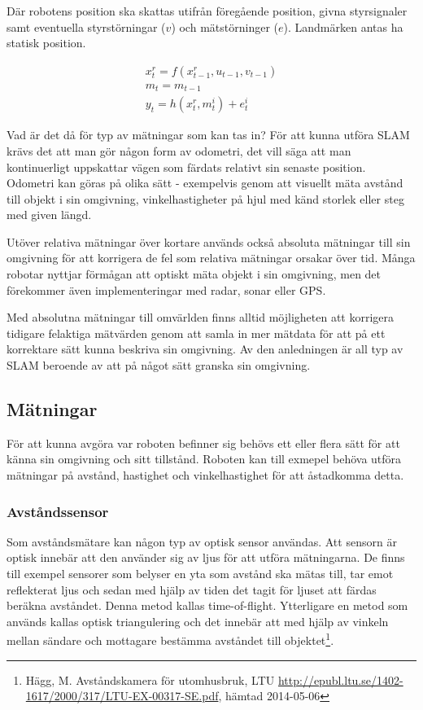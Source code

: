 \documentclass[a4paper,12pt,fleqn]{article}
\begin{document}
Där robotens position ska skattas utifrån föregående position, givna styrsignaler samt eventuella styrstörningar ($v$) och mätstörninger ($e$). Landmärken antas ha statisk position. 

\begin{gather}
x_{t}^r = f(x_{t-1}^r, u_{t-1}, v_{t-1}) \\
m_{t} = m_{t-1} \\
y_{t} = h(x_{t}^r,m_{t}^i) + e_{t}^i
\end{gather}

%
Vad är det då för typ av mätningar som kan tas in? För att kunna utföra SLAM krävs det att man gör någon form av odometri, det vill säga att man kontinuerligt uppskattar vägen som färdats relativt sin senaste position. Odometri kan göras på olika sätt - exempelvis genom att visuellt mäta avstånd till objekt i sin omgivning, vinkelhastigheter på hjul med känd storlek eller steg med given längd. 

Utöver relativa mätningar över kortare används också absoluta mätningar till sin omgivning för att korrigera de fel som relativa mätningar orsakar över tid. Många robotar nyttjar förmågan att optiskt mäta objekt i sin omgivning, men det förekommer även implementeringar med radar, sonar eller GPS. 

Med absolutna mätningar till omvärlden finns alltid möjligheten att korrigera tidigare felaktiga mätvärden genom att samla in mer mätdata för att på ett korrektare sätt kunna beskriva sin omgivning. Av den anledningen är all typ av SLAM beroende av att på något sätt granska sin omgivning. 

\subsection{Mätningar}

För att kunna avgöra var roboten befinner sig behövs ett eller flera sätt för att känna sin omgivning och sitt tillstånd. Roboten kan till exmepel behöva utföra mätningar på avstånd, hastighet och vinkelhastighet för att åstadkomma detta. 

\subsubsection{Avståndssensor}

Som avståndsmätare kan någon typ av optisk sensor användas. Att sensorn är optisk innebär att den använder sig av ljus för att utföra mätningarna. De finns till exempel sensorer som belyser en yta som avstånd ska mätas till, tar emot reflekterat ljus och sedan med hjälp av tiden det tagit för ljuset att färdas beräkna avståndet. Denna metod kallas time-of-flight. Ytterligare en metod som används kallas optisk triangulering och det innebär att med hjälp av vinkeln mellan sändare och mottagare bestämma avståndet till objektet\footnote{Hägg, M. Avståndskamera för utomhusbruk, LTU \url{http://epubl.ltu.se/1402-1617/2000/317/LTU-EX-00317-SE.pdf}, hämtad 2014-05-06}.
\end{document}
